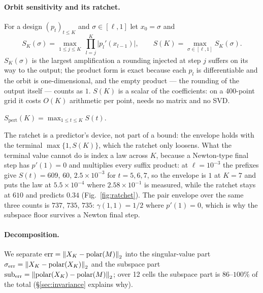 \paragraph{Orbit sensitivity and its ratchet.}
For a design $(p_t)_{t\le K}$ and $\sigma\in[\ell,1]$ let $x_0=\sigma$ and\begin{equation}
S_K(\sigma) = \max_{1\le j \le K}\ \prod_{l=j}^{K} \bigl|p_l'(x_{l-1})\bigr|,
\qquad S(K) = \max_{\sigma\in[\ell,1]} S_K(\sigma).
\label{eq:S}
\end{equation}
$S_K(\sigma)$ is the largest amplification a rounding injected at step $j$ suffers on its
way to the output; the product form is exact because each $p_l$ is differentiable and the
orbit is one-dimensional, and the empty product --- the rounding of the output itself ---
counts as $1$.  $S(K)$ is a scalar of the coefficients: on a 400-point grid it
costs $O(K)$ arithmetic per point, needs no matrix and no SVD.

\begin{definition}
\label{def:ratchet}
$S_{\mathrm{pert}}(K) = \max_{1\le t\le K} S(t)$.
\end{definition}

The ratchet is a predictor's device, not part of a bound: the envelope holds with the
terminal $\max\{1,S(K)\}$, which the ratchet only loosens.  What the terminal value cannot
do is index a law across $K$, because a Newton-type final step has $p'(1)=0$ and multiplies
every suffix product: at $\ell=10^{-3}$ the prefixes give $S(t)=609$, $60$,
$2.5\times10^{-3}$ for $t=5,6,7$, so the envelope is $1$ at $K=7$ and puts the law at
$5.5\times10^{-4}$ where $2.58\times10^{-1}$ is measured, while the ratchet stays at $610$
and predicts $0.34$ (Fig.~\ref{fig:ratchet}).  The pair envelope over the same three counts
is $737$, $735$, $735$: $\gamma(1,1)=1/2$ where $p'(1)=0$, which is why the subspace floor
survives a Newton final step.

\paragraph{Decomposition.}
We separate $\mathrm{err} = \left\lVert X_K - \operatorname{polar}(M) \right\rVert_2$ into the singular-value part
$\sigma_{\mathrm{err}} = \left\lVert X_K - \operatorname{polar}(X_K) \right\rVert_2$ and the subspace part
$\mathrm{sub}_{\mathrm{err}} = \left\lVert \operatorname{polar}(X_K) - \operatorname{polar}(M) \right\rVert_2$; over 12 cells the
subspace part is $86$--$100\%$ of the total (\S\ref{sec:invariance} explains why).
